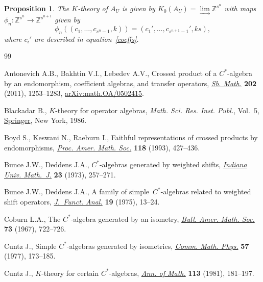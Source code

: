 \documentclass[10pt,a4paper]{amsart}
\newcommand{\Z}{{\mathbb Z}}
\numberwithin{equation}{section}
\newtheorem{Proposition}[Theorem]{Proposition}
 { \theoremstyle{definition}
\newtheorem{Definition}[Theorem]{Definition}
\newtheorem{Note}[Theorem]{Note}
\newtheorem{Example}[Theorem]{Example}
\newtheorem{Remark}[Theorem]{Remark} }
\begin{document}
\begin{Proposition}
The $K$-theory of $A_U$ is given by
$K_0(A_U) = \lim\limits_{\longrightarrow}\Z^{s^n}$
with maps $\phi_n\colon\Z^{s^n} \to \Z^{s^{n+1}}$ given by
\begin{equation*}
\phi_n((c_1,\dots,c_{s^n-1},k)) = (c_1',\dots,c_{s^{n+1}-1}',ks),
\end{equation*}
where $c_i'$ are described in equation~\eqref{coeffs}.
\end{Proposition}



\begin{thebibliography}{99}
\footnotesize\itemsep=0pt

Antonevich A.B., Bakhtin V.I., Lebedev A.V., Crossed product of a
 {$C^*$}-algebra by an endomorphism, coefficient algebras, and transfer
 operators, \href{https://doi.org/10.1070/SM2011v202n09ABEH004186}{\textit{Sb.
 Math.}} \textbf{202} (2011), 1253--1283,
 \href{http://arxiv.org/abs/math.OA/0502415}{arXiv:math.OA/0502415}.

Blackadar B., {$K$}-theory for operator algebras, \textit{Math. Sci. Res. Inst.
 Publ.}, Vol.~5, \href{https://doi.org/10.1007/978-1-4613-9572-0}{Springer},
 New York, 1986.

Boyd S., Keswani N., Raeburn I., Faithful representations of crossed products
 by endomorphisms, \href{https://doi.org/10.2307/2160319}{\textit{Proc. Amer.
 Math. Soc.}} \textbf{118} (1993), 427--436.

Bunce J.W., Deddens J.A., {$C^{\ast} $}-algebras generated by weighted shifts,
 \href{https://doi.org/10.1512/iumj.1973.23.23022}{\textit{Indiana Univ.
 Math.~J.}} \textbf{23} (1973), 257--271.

Bunce J.W., Deddens J.A., A family of simple~{$C^{\ast} $}-algebras related to
 weighted shift operators,
 \href{https://doi.org/10.1016/0022-1236(75)90003-8}{\textit{J.~Funct. Anal.}}
 \textbf{19} (1975), 13--24.

Coburn L.A., The {$C^{\ast} $}-algebra generated by an isometry,
 \href{https://doi.org/10.1090/S0002-9904-1967-11845-7}{\textit{Bull. Amer.
 Math. Soc.}} \textbf{73} (1967), 722--726.

Cuntz J., Simple {$C^*$}-algebras generated by isometries,
 \href{https://doi.org/10.1007/BF01625776}{\textit{Comm. Math. Phys.}}
 \textbf{57} (1977), 173--185.

Cuntz J., {$K$}-theory for certain {$C^{\ast} $}-algebras,
 \href{https://doi.org/10.2307/1971137}{\textit{Ann. of Math.}} \textbf{113}
 (1981), 181--197.


\end{thebibliography}
\end{document}

